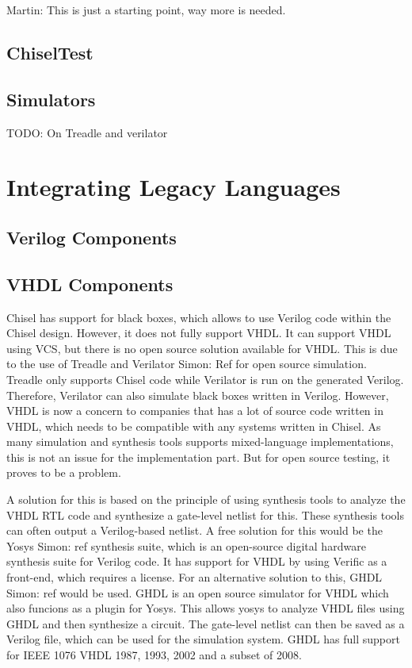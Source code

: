 \documentclass[a4paper, conference]{IEEEtran}
\newcommand{\todo}[1]{{\color{olive} TODO: #1}}
\newcommand{\martin}[1]{{\color{blue} Martin: #1}}
\newcommand{\simon}[1]{{\color{green} Simon: #1}}
\begin{document}
\martin{This is just a starting point, way more is needed.}

\subsection{ChiselTest}

\subsection{Simulators}

\todo{On Treadle and verilator}


\section{Integrating Legacy Languages}

\subsection{Verilog Components}

\subsection{VHDL Components}

Chisel has support for black boxes, which allows to use Verilog code within the Chisel design. However, it does not fully support VHDL. It can support VHDL using VCS, but there is no open source solution available for VHDL. This is due to the use of Treadle and Verilator \simon{Ref} for open source simulation. Treadle only supports Chisel code while Verilator is run on the generated Verilog. Therefore, Verilator can also simulate black boxes written in Verilog. However, VHDL is now a concern to companies that has a lot of source code written in VHDL, which needs to be compatible with any systems written in Chisel. As many simulation and synthesis tools supports mixed-language implementations, this is not an issue for the implementation part. But for open source testing, it proves to be a problem.

A solution for this is based on the principle of using synthesis tools to analyze the VHDL RTL code and synthesize a gate-level netlist for this. These synthesis tools can often output a Verilog-based netlist. A free solution for this would be the Yosys \simon{ref} synthesis suite, which is an open-source digital hardware synthesis suite for Verilog code. It has support for VHDL by using Verific as a front-end, which requires a license. For an alternative solution to this, GHDL \simon{ref} would be used. GHDL is an open source simulator for VHDL which also funcions as a plugin for Yosys. This allows yosys to analyze VHDL files using GHDL and then synthesize a circuit. The gate-level netlist can then be saved as a Verilog file, which can be used for the simulation system. GHDL has full support for IEEE 1076 VHDL 1987, 1993, 2002 and a subset of 2008.
\end{document}
